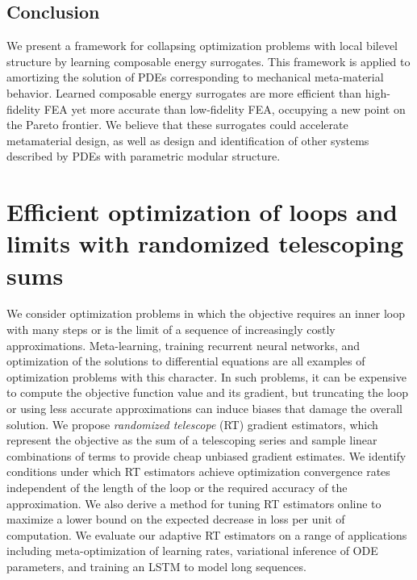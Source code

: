 \documentclass{puthesis}
\begin{document}







\section{Conclusion}
We present a framework for collapsing optimization problems with local bilevel structure by learning composable energy surrogates. This framework is applied to amortizing the solution of PDEs corresponding to mechanical meta-material behavior. Learned composable energy surrogates are more efficient than high-fidelity FEA yet more accurate than low-fidelity FEA, occupying a new point on the Pareto frontier. We believe that these surrogates could accelerate metamaterial design, as well as design and identification of other systems described by PDEs with parametric modular structure.

\chapter{Efficient optimization of loops and limits with randomized telescoping sums}
We consider optimization problems in which the objective requires an inner loop with many steps or is the limit of a sequence of increasingly costly approximations.
Meta-learning, training recurrent neural networks, and optimization of the solutions to differential equations are all examples of optimization problems with this character.
In such problems, it can be expensive to compute the objective function value and its gradient, but truncating the loop or using less accurate approximations can induce biases that damage the overall solution.
We propose \emph{randomized telescope} (RT) gradient estimators, which represent the objective as the sum of a telescoping series and sample linear combinations of terms to provide cheap unbiased gradient estimates.
We identify conditions under which RT estimators achieve optimization convergence rates independent of the length of the loop or the required accuracy of the approximation.
We also derive a method for tuning RT estimators online to maximize a lower bound on the expected decrease in loss per unit of computation.
We evaluate our adaptive RT estimators on a range of applications including meta-optimization of learning rates, variational inference of ODE parameters, and training an LSTM to model long sequences.
\end{document}
